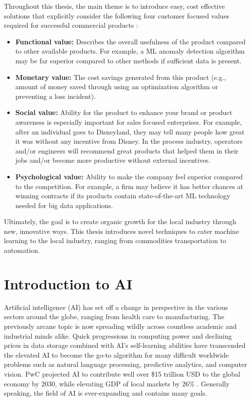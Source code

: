 Throughout this thesis, the main theme is to introduce easy, cost effective solutions that explicitly consider the following four customer focused values required for successful commercial products \cite{marketing}:
\begin{itemize}
    \item \textbf{Functional value:} Describes the overall usefulness of the product compared to other available products.  For example, a ML anomaly detection algorithm may be far superior compared to other methods if sufficient data is present.
    \item \textbf{Monetary value:} The cost savings generated from this product (e.g., amount of money saved through using an optimization algorithm or preventing a loss incident).  
    \item \textbf{Social value:} Ability for the product to enhance your brand or product awareness is especially important for sales focused enterprises.  For example, after an individual goes to Disneyland, they may tell many people how great it was without any incentive from Disney.  In the process industry, operators and/or engineers will recommend great products that helped them in their jobs and/or become more productive without external incentives.
    \item \textbf{Psychological value:} Ability to make the company feel superior compared to the competition.  For example, a firm may believe it has better chances at winning contracts if its products contain state-of-the-art ML technology needed for big data applications.
\end{itemize}
Ultimately, the goal is to create organic growth for the local industry through new, innovative ways. This thesis introduces novel techniques to cater machine learning to the local industry, ranging from commodities transportation to automation.

\section{Introduction to AI}
Artificial intelligence (AI) has set off a change in perspective in the various sectors around the globe, ranging from health care to manufacturing.  The previously arcane topic is now spreading wildly across countless academic and industrial minds alike. Quick progressions in computing power and declining prices in data storage combined with AI's self-learning abilities have transcended the elevated AI to become the go-to algorithm for many difficult worldwide problems such as natural language processing, predictive analytics, and computer vision.  PwC projected AI to contribute well over \$15 trillion USD to the global economy by 2030, while elevating GDP of local markets by 26\%  \cite{pwc}. Generally speaking, the field of AI is ever-expanding and contains many goals.

